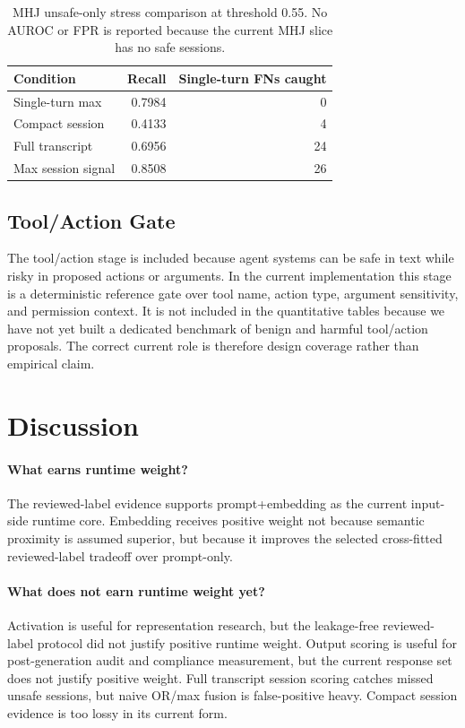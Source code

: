 \documentclass[11pt]{article}
\begin{document}
\begin{table}[H]
\centering
\begin{tabular}{lrr}
\toprule
Condition & Recall & Single-turn FNs caught \\
\midrule
Single-turn max & 0.7984 & 0 \\
Compact session & 0.4133 & 4 \\
Full transcript & 0.6956 & 24 \\
Max session signal & 0.8508 & 26 \\
\bottomrule
\end{tabular}
\caption{MHJ unsafe-only stress comparison at threshold 0.55. No AUROC or FPR is reported because
the current MHJ slice has no safe sessions.}
\label{tab:session-mhj}
\end{table}

\subsection{Tool/Action Gate}

The tool/action stage is included because agent systems can be safe in text while risky in proposed
actions or arguments. In the current implementation this stage is a deterministic reference gate
over tool name, action type, argument sensitivity, and permission context. It is not included in the
quantitative tables because we have not yet built a dedicated benchmark of benign and harmful
tool/action proposals. The correct current role is therefore design coverage rather than empirical
claim.

\FloatBarrier

\section{Discussion}

\paragraph{What earns runtime weight?}
The reviewed-label evidence supports prompt+embedding as the current input-side runtime core.
Embedding receives positive weight not because semantic proximity is assumed superior, but because
it improves the selected cross-fitted reviewed-label tradeoff over prompt-only.

\paragraph{What does not earn runtime weight yet?}
Activation is useful for representation research, but the leakage-free reviewed-label protocol did
not justify positive runtime weight. Output scoring is useful for post-generation audit and
compliance measurement, but the current response set does not justify positive weight. Full
transcript session scoring catches missed unsafe sessions, but naive OR/max fusion is
false-positive heavy. Compact session evidence is too lossy in its current form.
\end{document}
